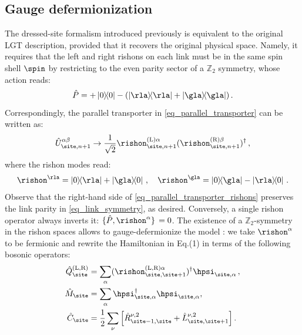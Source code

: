 \documentclass[aps,prl,reprint,twocolumn,superscriptaddress,floatfix,nofootinbib]{revtex4-2}
\begin{document}
\subsection{Gauge defermionization}
The dressed-site formalism introduced previously is equivalent to the original LGT description, provided that it recovers the original physical space.
Namely, it requires that the left and right rishons on each link must be in the same spin shell $\spin$ by restricting to the even parity sector of a $\mathbb{Z}_2$ symmetry, whose action reads:
\begin{equation}
    \label{eq_link_symmetry}
    \hat{P}= +\op{0} - (\op{\rla} + \op{\gla})
    \,.
\end{equation}
Correspondingly, the parallel transporter in \cref{eq_parallel_transporter} can be written as:
\begin{equation}
    \label{eq_parallel_transporter_rishons}
    \hat{U}^{\alpha\beta}_{\site,n+1} \to \frac{1}{\sqrt{2}}
    \rishon^{\mathrm{(L)} \alpha}_{\site,n+1}
    (\rishon^{\mathrm{(R)} \beta}_{\site,n+1})^\dagger
    \,,
\end{equation}
where the rishon modes read:
\begin{equation}
    \rishon^{\rla} = \ketbra{0}{\rla} + \ketbra{\gla}{0}
    \,,\quad
    \rishon^{\gla} = \ketbra{0}{\gla} - \ketbra{\rla}{0}
    \,.
\end{equation}
Observe that the right-hand side of \cref{eq_parallel_transporter_rishons} preserves the link parity in \cref{eq_link_symmetry}, as desired.
Conversely, a single rishon operator always inverts it:
\begin{math}
    \acomm*{\hat{P}}{\rishon^{\alpha}} = 0
\end{math}.
The existence of a $\mathbb{Z}_2$-symmetry in the rishon spaces allows to gauge-defermionize the model \cite{Cataldi2024Simulating2+1DSU2, Ballarin2024DigitalQuantumSimulation}:
we take $\rishon^{\alpha}$ to be fermionic and rewrite the Hamiltonian in Eq.(1) in terms of the following bosonic operators:
\begin{equation}
    \begin{aligned}
        \hat{Q}_{\site}^{\mathrm{(L,R)}} & = \sum_{\alpha} (\rishon^{\mathrm{(L,R)} \alpha}_{\site,\site+1})^\dagger \hpsi_{\site,\alpha}
        \,,                                                                                                                               \\
        \hat{M}_{\site}                  & =\sum_{\alpha} \hpsi_{\site,\alpha}^\dagger\hpsi_{\site,\alpha},                               \\
        \hat{C}_{\site}                  & =\frac{1}{2}\sum_{\nu}\qty[\hat{R}^{\nu,2}_{\site-1, \site}+\hat{L}^{\nu,2}_{\site, \site+1}]
        \,.
    \end{aligned}
\end{equation}
\end{document}
